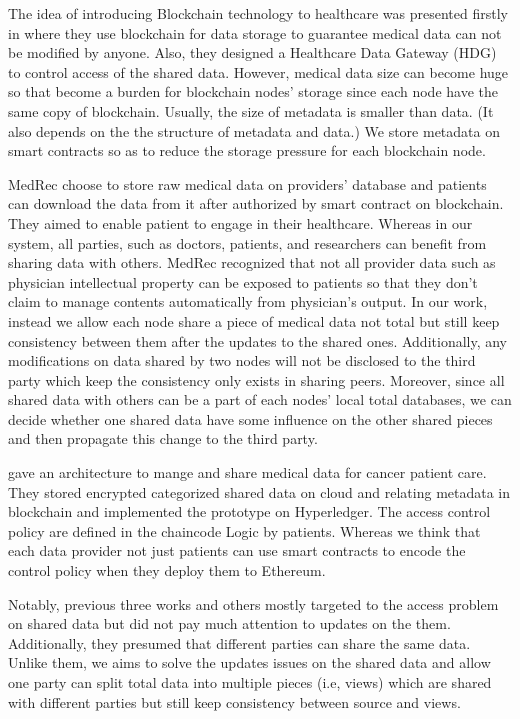 \documentclass[conference]{IEEEtran}
\begin{document}
The idea of introducing Blockchain technology to healthcare was presented firstly in \cite{yue2016healthcare} where they use blockchain for data storage to guarantee medical data can not be modified by anyone. Also, they designed a Healthcare Data Gateway (HDG) to control access of the shared data. However, medical data size can become huge so that become a burden for blockchain nodes' storage since each node have the same copy of blockchain. Usually, the size of metadata is smaller than data. (It also depends on the the structure of metadata and data.) We store metadata on smart contracts so as to reduce the storage pressure for each blockchain node.

MedRec \cite{azaria2016medrec} choose to store raw medical data on providers' database and patients can download the data from it after authorized by smart contract on blockchain. They aimed to enable patient to engage in their healthcare. Whereas in our system, all parties, such as doctors, patients, and researchers can benefit from sharing data with others. MedRec recognized that not all provider data such as physician intellectual property can be exposed to patients \cite{us2017individuals, grossman2011clinical} so that they don't claim to manage contents automatically from physician's output. In our work, instead we allow each node share a piece of medical data not total but still keep consistency between them after the updates to the shared ones. Additionally, any modifications on data shared by two nodes will not be disclosed to the third party which keep the consistency only exists in sharing peers. Moreover, since all shared data with others can be a part of each nodes' local total databases, we can decide whether one shared data have some influence on the other shared pieces and then propagate this change to the third party.

\cite{dubovitskaya2017secure} gave an architecture to mange and share medical data for cancer patient care. They stored encrypted categorized shared data on cloud and relating metadata in blockchain and implemented the prototype on Hyperledger\cite{hyperledger2017hyperledger}. The access control policy are defined in the chaincode Logic by patients. Whereas we think that each data provider not just patients can use smart contracts to encode the control policy when they deploy them to Ethereum. 

Notably, previous three works and others \cite{liu2018bpds,xia2017bbds,amofa2018blockchain,dagher2018ancile,fan2018medblock} mostly targeted to the access problem on shared data but did not pay much attention to updates on the them. Additionally, they presumed that different parties can share the same data. Unlike them, we aims to solve the updates issues on the shared data and allow one party can split total data into multiple pieces (i.e, views) which are shared with different parties but still keep consistency between source and views.
\end{document}
